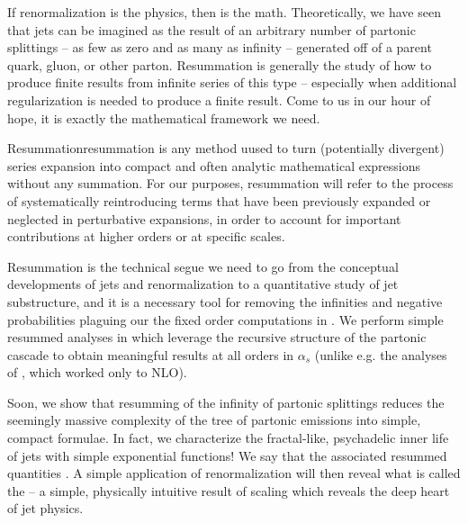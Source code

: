 


If \gls{renormalization} is the physics, then  is the math.
%
Theoretically, we have seen that jets can be imagined as the result of an arbitrary number of partonic splittings -- as few as zero and as many as infinity -- generated off of a parent quark, gluon, or other parton.
%
Resummation is generally the study of how to produce finite results from infinite series of this type -- especially when additional regularization is needed to produce a finite result.
%
Come to us in our hour of hope, it is exactly the mathematical framework we need.

\begin{definitionbox}{Resummation}{resummation}
     is any method uused to turn (potentially divergent) series expansion into compact and often analytic mathematical expressions without any summation.
    For our purposes, resummation will refer to the process of systematically reintroducing terms that have been previously expanded or neglected in perturbative expansions, in order to account for important contributions at higher orders or at specific scales.
\end{definitionbox}


Resummation is the technical segue we need to go from the conceptual developments of jets and renormalization to a quantitative study of jet substructure, and it is a necessary tool for removing the infinities and negative probabilities plaguing our the fixed order computations in .
%
We perform simple resummed analyses in  which leverage the recursive structure of the partonic cascade to obtain meaningful results at all orders in \(\alpha_s\) (unlike e.g. the analyses of , which worked only to NLO).


Soon, we show that resumming of the infinity of partonic splittings reduces the seemingly massive complexity of the tree of partonic emissions into simple, compact formulae.
%
In fact, we characterize the fractal-like, psychadelic inner life of jets with simple exponential functions!
%
We say that the associated resummed quantities .
%
A simple application of renormalization will then reveal what is called the  -- a simple, physically intuitive result of scaling which reveals the deep heart of jet physics.


